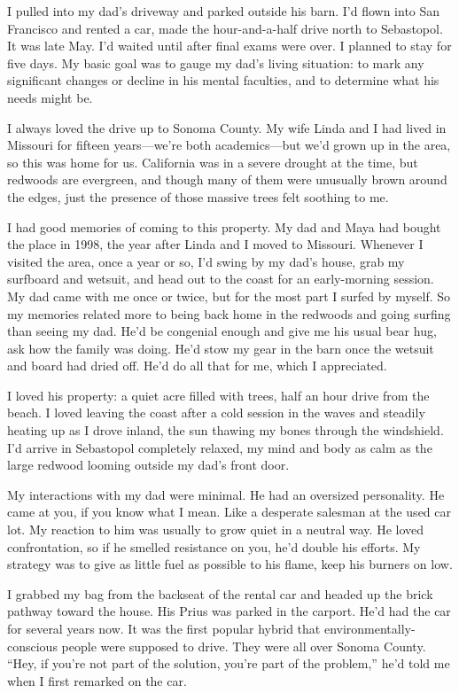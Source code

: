 \documentclass[12pt]{book}
\begin{document}
I pulled into my dad's driveway and parked outside his barn. I'd flown into San Francisco and rented a car, made the hour-and-a-half drive north to Sebastopol. It was late May. I'd waited until after final exams were over. I planned to stay for five days. My basic goal was to gauge my dad's living situation: to mark any significant changes or decline in his mental faculties, and to determine what his needs might be.

I always loved the drive up to Sonoma County. My wife Linda and I had lived in Missouri for fifteen years---we're both academics---but we'd grown up in the area, so this was home for us. California was in a severe drought at the time, but redwoods are evergreen, and though many of them were unusually brown around the edges, just the presence of those massive trees felt soothing to me.

I had good memories of coming to this property. My dad and Maya had bought the place in 1998, the year after Linda and I moved to Missouri. Whenever I visited the area, once a year or so, I'd swing by my dad's house, grab my surfboard and wetsuit, and head out to the coast for an early-morning session. My dad came with me once or twice, but for the most part I surfed by myself. So my memories related more to being back home in the redwoods and going surfing than seeing my dad. He'd be congenial enough and give me his usual bear hug, ask how the family was doing. He'd stow my gear in the barn once the wetsuit and board had dried off. He'd do all that for me, which I appreciated.

I loved his property: a quiet acre filled with trees, half an hour drive from the beach. I loved leaving the coast after a cold session in the waves and steadily heating up as I drove inland, the sun thawing my bones through the windshield. I'd arrive in Sebastopol completely relaxed, my mind and body as calm as the large redwood looming outside my dad's front door.

My interactions with my dad were minimal. He had an oversized personality. He came at you, if you know what I mean. Like a desperate salesman at the used car lot. My reaction to him was usually to grow quiet in a neutral way. He loved confrontation, so if he smelled resistance on you, he'd double his efforts. My strategy was to give as little fuel as possible to his flame, keep his burners on low.

I grabbed my bag from the backseat of the rental car and headed up the brick pathway toward the house. His Prius was parked in the carport. He'd had the car for several years now. It was the first popular hybrid that environmentally-conscious people were supposed to drive. They were all over Sonoma County. ``Hey, if you're not part of the solution, you're part of the problem,'' he'd told me when I first remarked on the car.
\end{document}
